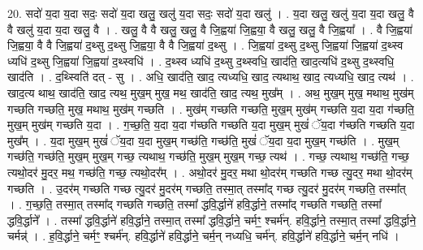 \documentclass[17pt]{extarticle}
\begin{document}
20. सदो॑ य॒दा य॒दा सदः॒ सदो॑ य॒दा खलु॒ खलु॑ य॒दा सदः॒ सदो॑ य॒दा खलु॑ । . य॒दा खलु॒ खलु॑ य॒दा य॒दा खलु॒ वै वै खलु॑ य॒दा य॒दा खलु॒ वै । . खलु॒ वै वै खलु॒ खलु॒ वै जि॒ह्वया॑ जि॒ह्वया॒ वै खलु॒ खलु॒ वै जि॒ह्वया᳚ । . वै जि॒ह्वया॑ जि॒ह्वया॒ वै वै जि॒ह्वया॑ द॒थ्सु द॒थ्सु जि॒ह्वया॒ वै वै जि॒ह्वया॑ द॒थ्सु । . जि॒ह्वया॑ द॒थ्सु द॒थ्सु जि॒ह्वया॑ जि॒ह्वया॑ द॒थ्स्व ध्यधि॑ द॒थ्सु जि॒ह्वया॑ जि॒ह्वया॑ द॒थ्स्वधि॑ । . द॒थ्स्व ध्यधि॑ द॒थ्सु द॒थ्स्वधि॒ खाद॑ति॒ खाद॒त्यधि॑ द॒थ्सु द॒थ्स्वधि॒ खाद॑ति । . द॒थ्स्विति॑ दत् - सु । . अधि॒ खाद॑ति॒ खाद॒ त्यध्यधि॒ खाद॒ त्यथाथ॒ खाद॒ त्यध्यधि॒ खाद॒ त्यथ॑ । . खाद॒त्य थाथ॒ खाद॑ति॒ खाद॒ त्यथ॒ मुख॒म् मुख॒ मथ॒ खाद॑ति॒ खाद॒ त्यथ॒ मुख᳚म् । . अथ॒ मुख॒म् मुख॒ मथाथ॒ मुख॑म् गच्छति गच्छति॒ मुख॒ मथाथ॒ मुख॑म् गच्छति । . मुख॑म् गच्छति गच्छति॒ मुख॒म् मुख॑म् गच्छति य॒दा य॒दा ग॑च्छति॒ मुख॒म् मुख॑म् गच्छति य॒दा । . ग॒च्छ॒ति॒ य॒दा य॒दा ग॑च्छति गच्छति य॒दा मुख॒म् मुखं॑ ॅय॒दा ग॑च्छति गच्छति य॒दा मुख᳚म् । . य॒दा मुख॒म् मुखं॑ ॅय॒दा य॒दा मुख॒म् गच्छ॑ति॒ गच्छ॑ति॒ मुखं॑ ॅय॒दा य॒दा मुख॒म् गच्छ॑ति । . मुख॒म् गच्छ॑ति॒ गच्छ॑ति॒ मुख॒म् मुख॒म् गच्छ॒ त्यथाथ॒ गच्छ॑ति॒ मुख॒म् मुख॒म् गच्छ॒ त्यथ॑ । . गच्छ॒ त्यथाथ॒ गच्छ॑ति॒ गच्छ॒ त्यथो॒दर॑ मु॒दर॒ मथ॒ गच्छ॑ति॒ गच्छ॒ त्यथो॒दर᳚म् । . अथो॒दर॑ मु॒दर॒ मथा थो॒दर॑म् गच्छति गच्छ त्यु॒दर॒ मथा थो॒दर॑म् गच्छति । . उ॒दर॑म् गच्छति गच्छ त्यु॒दर॑ मु॒दर॑म् गच्छति॒ तस्मा॒त् तस्मा᳚द् गच्छ त्यु॒दर॑ मु॒दर॑म् गच्छति॒ तस्मा᳚त् । . ग॒च्छ॒ति॒ तस्मा॒त् तस्मा᳚द् गच्छति गच्छति॒ तस्मा᳚ द्धवि॒र्द्धाने॑ हवि॒र्द्धाने॒ तस्मा᳚द् गच्छति गच्छति॒ तस्मा᳚
द्धवि॒र्द्धाने᳚ । . तस्मा᳚ द्धवि॒र्द्धाने॑ हवि॒र्द्धाने॒ तस्मा॒त् तस्मा᳚ द्धवि॒र्द्धाने॒ चर्मꣳ॒॒ श्चर्म॑न्. हवि॒र्द्धाने॒ तस्मा॒त् तस्मा᳚ द्धवि॒र्द्धाने॒ चर्मन्न्॑ । . ह॒वि॒र्द्धाने॒ चर्मꣳ॒॒ श्चर्म॑न्. हवि॒र्द्धाने॑ हवि॒र्द्धाने॒ चर्म॒न् नध्यधि॒ चर्म॑न्. हवि॒र्द्धाने॑ हवि॒र्द्धाने॒ चर्म॒न् नधि॑ । \newline
\end{document}
